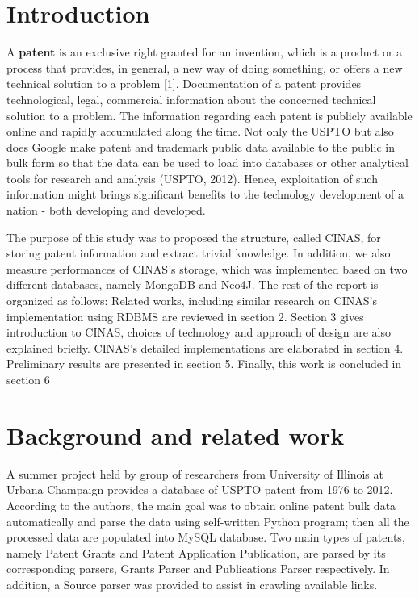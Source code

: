 \documentclass{sig-alternate}
\begin{document}
{\section{Introduction}
A \textbf{patent} is an exclusive right granted for an invention, which is a product or a process that provides, in general, a new way of doing something, or offers a new technical solution to a 
problem [1]. Documentation of a patent provides technological, legal, commercial information about the concerned technical solution to a problem. The information regarding each patent is publicly available online and rapidly accumulated along the time. Not only the USPTO but also does Google make patent and trademark public data available to the public in bulk form so that the data can be used to load into databases or other analytical tools for research and analysis (USPTO, 2012). Hence, exploitation of such information might brings significant benefits to the technology development of a nation - both developing and developed.

The purpose of this study was to proposed the structure, called CINAS, for storing patent information and extract trivial knowledge. In addition, we also measure performances of CINAS's storage, which was implemented based on two different databases, namely MongoDB and Neo4J. The rest of the report is organized as follows: Related works, including similar research on CINAS's implementation using RDBMS are reviewed in section 2. Section 3 gives introduction to CINAS, choices of technology and approach of design are also explained briefly. CINAS's detailed implementations are elaborated in section 4. Preliminary results are presented in section 5. Finally, this work is concluded in section 6

\section{Background and related work}
A summer project held by group of researchers from University of Illinois at Urbana-Champaign provides a database of USPTO patent from 1976 to 2012. According to the authors,  the main goal was to obtain online patent bulk data automatically and parse the data using self-written Python program; then all the processed data are populated into MySQL database. Two main types of patents, namely Patent Grants and Patent Application Publication, are parsed by its corresponding parsers, Grants Parser and Publications Parser respectively. In addition, a Source parser was provided to assist in crawling available links.

}
\end{document}
